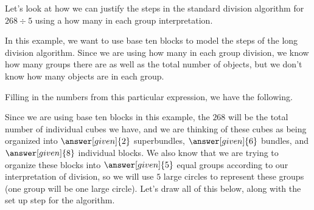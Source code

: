 \documentclass{ximera}
\begin{document}
\begin{example}
Let's look at how we can justify the steps in the standard division algorithm for $268 \div 5$ using a how many in each group interpretation. 

In this example, we want to use base ten blocks to model the steps of the long division algorithm. Since we are using how many in each group division, we know how many groups there are as well as the total number of objects, but we don't know how many objects are in each group. 

\begin{image}
\end{image}
Filling in the numbers from this particular expression, we have the following.

\begin{image}
\end{image}


Since we are using base ten blocks in this example, the $268$ will be the total number of individual cubes we have, and we are thinking of these cubes as being organized into $\answer[given]{2}$ superbundles, $\answer[given]{6}$ bundles, and $\answer[given]{8}$ individual blocks. We also know that we are trying to organize these blocks into $\answer[given]{5}$ equal groups according to our interpretation of division, so we will use $5$ large circles to represent these groups (one group will be one large circle). Let's draw all of this below, along with the set up step for the algorithm.


\end{example}
\end{document}
